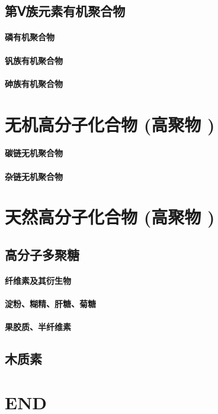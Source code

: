 \documentclass[UTF8]{../03-Chemistry}
\begin{document}
\section{第Ⅴ族元素有机聚合物}
    \subsubsection{磷有机聚合物}
    \subsubsection{钒族有机聚合物}
    \subsubsection{砷族有机聚合物}








\chapter{无机高分子化合物 (高聚物 )}
\subsubsection{碳链无机聚合物}
\subsubsection{杂链无机聚合物}








\chapter{天然高分子化合物 (高聚物 )}
\section{高分子多聚糖}
    \subsubsection{纤维素及其衍生物}
    \subsubsection{淀粉、糊精、肝糖、菊糖}
    \subsubsection{果胶质、半纤维素}
\section{木质素}


\chapter{END}
\end{document}
